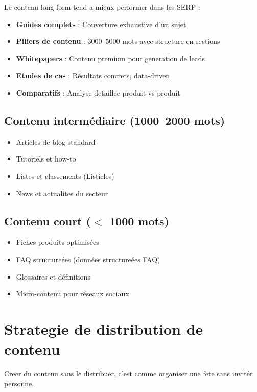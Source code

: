\documentclass[12pt,a4paper,twoside]{report}
\begin{document}
Le contenu long-form tend a mieux performer dans les SERP :

\begin{itemize}
    \item \textbf{Guides complets} : Couverture exhaustive d'un sujet
    \item \textbf{Piliers de contenu} : 3000--5000 mots avec structure en sections
    \item \textbf{Whitepapers} : Contenu premium pour generation de leads
    \item \textbf{Etudes de cas} : Résultats concrets, data-driven
    \item \textbf{Comparatifs} : Analyse detaillee produit vs produit
\end{itemize}

\subsection{Contenu intermédiaire (1000--2000 mots)}

\begin{itemize}
    \item Articles de blog standard
    \item Tutoriels et how-to
    \item Listes et classements (Listicles)
    \item News et actualites du secteur
\end{itemize}

\subsection{Contenu court ($<$ 1000 mots)}

\begin{itemize}
    \item Fiches produits optimisées
    \item FAQ structureées (données structureées FAQ)
    \item Glossaires et définitions
    \item Micro-contenu pour réseaux sociaux
\end{itemize}

\section{Strategie de distribution de contenu}

Creer du contenu sans le distribuer, c'est comme organiser une fete sans invitér personne.
\end{document}
